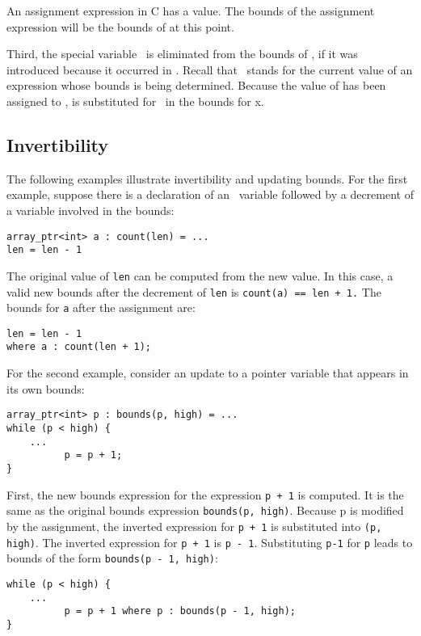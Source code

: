 An assignment expression in C has a value. The bounds of the assignment
expression will be the bounds of  at this point.

Third, the special variable \exprcurrentvalue\ is eliminated
from the bounds of , if it was introduced because it occurred in
. Recall that
\exprcurrentvalue\ stands for the current value of an
expression whose bounds is being determined. Because the value of
 has been assigned to ,  is substituted for
\exprcurrentvalue\ in the bounds for x.

\subsection{Invertibility}

The following examples illustrate invertibility and updating bounds. For
the first example, suppose there is a declaration of an
\arrayptr\ variable followed by a decrement of a variable
involved in the bounds:

\begin{verbatim}
array_ptr<int> a : count(len) = ...
len = len - 1
\end{verbatim}

The original value of \texttt{len} can be computed from the new value.
In this case, a valid new bounds after the decrement of \texttt{len} is
\texttt{count(a) == len + 1.} The bounds for \texttt{a} after the
assignment are:
\begin{verbatim}
len = len - 1
where a : count(len + 1);
\end{verbatim}

For the second example, consider an update to a pointer variable that
appears in its own bounds:
\begin{verbatim}
array_ptr<int> p : bounds(p, high) = ...         
while (p < high) {
    ...
          p = p + 1;
}
\end{verbatim}

First, the new bounds expression for the expression \verb|p + 1| is
computed. It is the same as the original bounds expression
\verb|bounds(p, high)|. Because p is modified by the assignment, the
inverted expression for \verb|p + 1| is substituted into 
\verb|(p, high)|. The inverted expression for \verb|p + 1| is \verb|p - 1|.
Substituting \verb|p-1| for \verb|p| leads to bounds of the form
\verb|bounds(p - 1, high)|:

\begin{verbatim}
while (p < high) {
    ...
          p = p + 1 where p : bounds(p - 1, high);
}
\end{verbatim}

